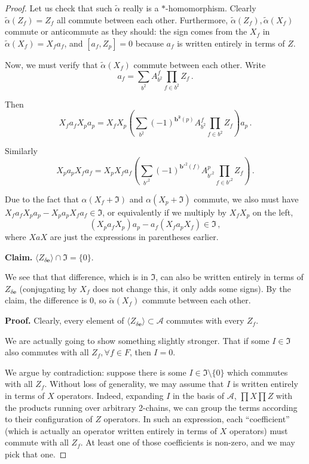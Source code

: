 \documentclass[aps,twocolumn,prx,floatfix,preprintnumbers, nofootinbib,10pt]{revtex4-2}
\numberwithin{equation}{section}
\theoremstyle{definition}
\theoremstyle{remark}
\theoremstyle{claim}
\newcommand{\be}{\begin{equation}}
\newcommand{\ee}{\end{equation}}
\newcommand{\mc}[1]{\mathcal{#1}}
\newcommand{\paren}[1]{\left( #1 \right)}
\begin{document}
\begin{proof}
 Let us check that such $\tilde{\alpha}$ really is a $*$-homomorphism. Clearly $\tilde{\alpha}(Z_f) = Z_f$ all commute between each other. Furthermore, $\tilde{\alpha}(Z_f), \tilde{\alpha}(X_f)$ commute or anticommute as they should: the sign comes from the $X_f$ in $\tilde{\alpha}(X_f) = X_f a_f$, and $[a_f, Z_p] = 0$ because $a_f$ is written entirely in terms of $Z$.

 Now, we must verify that $\tilde{\alpha}(X_f)$ commute between each other. Write
 \be
 a_f = \sum_{b^2} A^f_{b^2} \prod_{f \in b^2} Z_f \,.
 \ee

 Then
 \be
 X_f a_f X_p a_p = X_f X_p \paren{\sum_{b^2} (-1)^{\bm{b^2}(p)} A^f_{b^2} \prod_{f \in b^2} Z_f } a_p \,.
 \ee

 Similarly
 \be
 X_p a_p X_f a_f = X_p X_f a_f \paren{ \sum_{b'^2} (-1)^{\bm{b}'^2(f)} A^p_{b'^2} \prod_{f \in b'^2} Z_f } \,.
 \ee

 Due to the fact that $\alpha(X_f + \mathfrak{I})$ and $\alpha(X_p + \mathfrak{I})$ commute, we also must have $X_f a_f X_p a_p - X_p a_p X_f a_f \in \mathfrak{I}$, or equivalently if we multiply by $X_f X_p$ on the left,
 \be
 (X_p a_f X_p) a_p - a_f (X_f a_p X_f) \in \mathfrak{I} \,,
 \ee
 where $X a X$ are just the expressions in parentheses earlier.
 
 \textbf{Claim.} $\langle Z_{\delta \bm{e}} \rangle \cap \mathfrak{I} = \{ 0 \}$.

 We see that that difference, which is in $\mathfrak{I}$, can also be written entirely in terms of $Z_{\delta \bm{e}}$ (conjugating by $X_f$ does not change this, it only adds some signs). By the claim, the difference is $0$, so $\tilde{\alpha}(X_f)$ commute between each other.

 \textbf{Proof.} Clearly, every element of $\langle Z_{\delta \bm{e}} \rangle \subset \mc{A}$ commutes with every $Z_f$.

 We are actually going to show something slightly stronger. That if some $I \in \mathfrak{I}$ also commutes with all $Z_f, \forall f \in F$, then $I = 0$.

 We argue by contradiction: suppose there is some $I \in \mathfrak{I} \setminus \{0\}$ which commutes with all $Z_f$. Without loss of generality, we may assume that $I$ is written entirely in terms of $X$ operators. Indeed, expanding $I$ in the basis of $\mc{A}$, $\prod X \prod Z$ with the products running over arbitrary 2-chains, we can group the terms according to their configuration of $Z$ operators. In such an expression, each ``coefficient'' (which is actually an operator written entirely in terms of $X$ operators) must commute with all $Z_f$. At least one of those coefficients is non-zero, and we may pick that one.


\end{proof}
\end{document}
